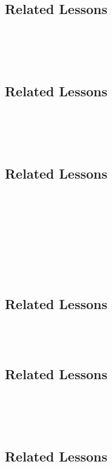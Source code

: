 \subsection{Related Lessons} 
\fouraFourteen{}\\
\fouriSeven{}\\
\fourjFour{}\\
%
\subsection{Related Lessons}
\fourdOne{}\\
\fouriSeven{}\\
\fourjFour{}\\
%
\subsection{Related Lessons}
\foureEight{}\\
\fouriSeven{}\\
\fourjTwo{}\\
\fourjFive{}\\
\fourjSix{}\\
\fourjSeven{}\\
\fourjEight{}\\
%
\subsection{Related Lessons}
\foureFour{}\\
\fouraFourteen{}\\
%
\subsection{Related Lessons}
\fourkTwo{}\\
\fourFKFourty{}\\
\fourFKFourtyTwo{}\\
%
\subsection{Related Lessons}
\fouraFourteen{}\\
\fourbThree{}\\
\foureEight{}\\
\fourgFour{}\\
